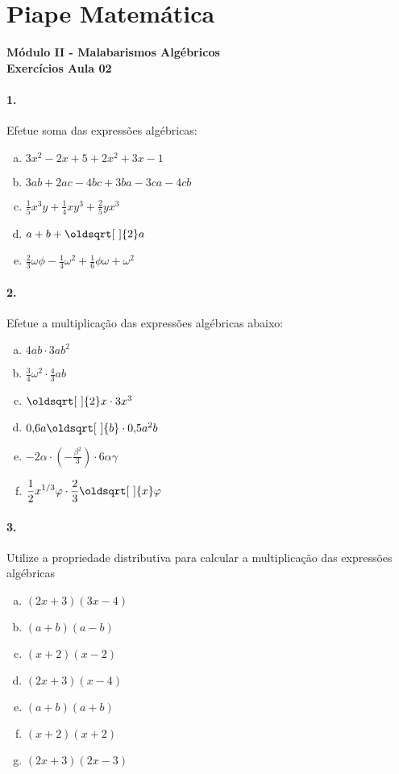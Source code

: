 \documentclass[a4paper,twocolumn,12pt]{article}
\renewcommand*{\sqrt}[2][\ ]{\oldsqrt[#1]{#2}}
\begin{document}
 
  
\section*{Piape Matemática} 
\textbf{Módulo II - Malabarismos Algébricos}\\
\textbf{Exercícios Aula 02}         

\paragraph{1.} Efetue soma das expressões algébricas:
\begin{enumerate}[a)]
\item $3x^2 - 2x + 5 + 2x^2 + 3x - 1$
\item $3ab + 2ac - 4bc + 3ba - 3ca -4cb$
\item $\displaystyle\frac{1}{5}x^3y + \frac{1}{4}xy^3 + \frac{2}{5}yx^3$
\item $a + b + \sqrt{2}a$
\item $\frac{2}{3}\omega\phi - \frac{1}{4}\omega^2 + \frac{1}{6}\phi\omega + \omega^2$
\end{enumerate}

\paragraph*{2.} Efetue a multiplicação das expressões algébricas abaixo:

\begin{enumerate}[a)]
\item $4ab \cdot 3ab^2$
\item $\displaystyle\frac{3}{4}\omega^2 \cdot \frac{4}{3}ab$
\item $\sqrt{2}x \cdot 3x^3$
\item $0,\!6 a\sqrt{b} \cdot 0,\!5 a^2b$
\item $\displaystyle-2\alpha \cdot \left(-\frac{\beta^2}{3}\right) \cdot 6\alpha\gamma$
\item $\displaystyle\frac{1}{2}x^{1/3}\varphi \cdot \frac{2}{3}\sqrt{x}\varphi$ 
\end{enumerate}


\paragraph{3.} Utilize a propriedade distributiva para calcular a multiplicação das expressões algébricas
\begin{enumerate}[a)]
\item $(2x + 3)(3x - 4)$
\item $(a + b)(a - b)$
\item $(x + 2)(x - 2)$
\item $(2x + 3)(x - 4)$
\item $(a + b)(a + b)$
\item $(x + 2)(x + 2)$
\item $(2x + 3)(2x - 3)$ 
\end{enumerate}
\newpage
\end{document}
